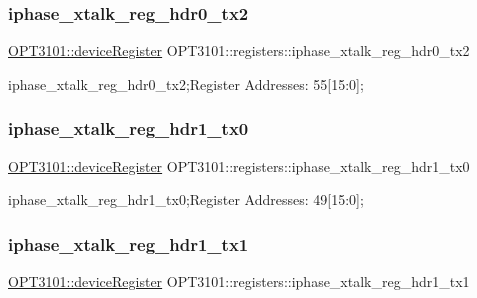 \subsubsection{\texorpdfstring{iphase\+\_\+xtalk\+\_\+reg\+\_\+hdr0\+\_\+tx2}{iphase\_xtalk\_reg\_hdr0\_tx2}}
{\footnotesize\ttfamily \mbox{\hyperlink{class_o_p_t3101_1_1device_register}{O\+P\+T3101\+::device\+Register}} O\+P\+T3101\+::registers\+::iphase\+\_\+xtalk\+\_\+reg\+\_\+hdr0\+\_\+tx2}



iphase\+\_\+xtalk\+\_\+reg\+\_\+hdr0\+\_\+tx2;Register Addresses\+: 55\mbox{[}15\+:0\mbox{]}; 

\mbox{\label{class_o_p_t3101_1_1registers_a7fab5a5b19baca26a16000bf2df02002}} 
\subsubsection{\texorpdfstring{iphase\+\_\+xtalk\+\_\+reg\+\_\+hdr1\+\_\+tx0}{iphase\_xtalk\_reg\_hdr1\_tx0}}
{\footnotesize\ttfamily \mbox{\hyperlink{class_o_p_t3101_1_1device_register}{O\+P\+T3101\+::device\+Register}} O\+P\+T3101\+::registers\+::iphase\+\_\+xtalk\+\_\+reg\+\_\+hdr1\+\_\+tx0}



iphase\+\_\+xtalk\+\_\+reg\+\_\+hdr1\+\_\+tx0;Register Addresses\+: 49\mbox{[}15\+:0\mbox{]}; 

\mbox{\label{class_o_p_t3101_1_1registers_af9c224172ff25332ec86b202ce405407}} 
\subsubsection{\texorpdfstring{iphase\+\_\+xtalk\+\_\+reg\+\_\+hdr1\+\_\+tx1}{iphase\_xtalk\_reg\_hdr1\_tx1}}
{\footnotesize\ttfamily \mbox{\hyperlink{class_o_p_t3101_1_1device_register}{O\+P\+T3101\+::device\+Register}} O\+P\+T3101\+::registers\+::iphase\+\_\+xtalk\+\_\+reg\+\_\+hdr1\+\_\+tx1}



